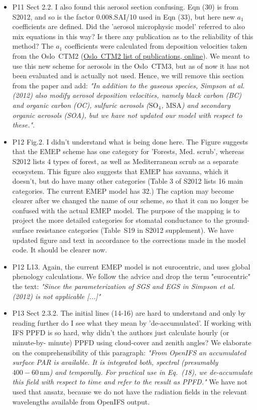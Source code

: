 \begin{itemize}
\item {\color{blue}P11 Sect 2.2. I also found this aerosol section confusing. Eqn (30) is from S2012,
and so is the factor 0.008.SAI/10 used in Eqn (33), but here new $a_1$ coefficients
are defined. Did the ’aerosol microphysic model’ referred to also mix equations
in this way? Is there any publication as to the reliability of this method?}
  The $a_1$ coefficients were calculated from deposition velocities taken from the Oslo~CTM2 (\href{http://folk.uio.no/mariantl/osloctm3/history.html}{Oslo~CTM2 list of publications, online}). We meant to use this new scheme for aerosols in the Oslo~CTM3, but as of now it has not been evaluated and is actually not used. Hence, we will remove this section from the paper and add: \emph{"In addition to the gaseous species, Simpson at al. (2012) also modify aerosol deposition velocities, namely black carbon (BC) and organic carbon (OC), sulfuric aerosols ($\mathrm{SO_4}$, $\mathrm{MSA}$) and secondary organic aerosols (SOA), but we have not updated our model with respect to these."}.
  
\item {\color{blue}P12 Fig.2. I didn’t understand what is being done here. The Figure suggests that
the EMEP scheme has one category for ’Forests, Med. scrub’, whereas S2012
lists 4 types of forest, as well as Mediterranean scrub as a separate ecosystem.
This figure also suggests that EMEP has savanna, which it doesn’t, but do have
many other categories (Table 3 of S2012 lists 16 main categories. The current
EMEP model has 32.)}
  The caption may become clearer after we changed the name of our scheme, so that it can no longer be confused with the actual EMEP model. The purpose of the mapping is to project the more detailed categories for stomatal conductance to the ground-surface resistance categories (Table~S19 in S2012 supplement). We have updated figure and text in accordance to the corrections made in the model code. It should be clearer now.
  
\item {\color{blue}P12 L13. Again, the current EMEP model is not eurocentric, and uses global
  phenology calculations.}
  We follow the advice and drop the term "eurocentric" the text: \emph{"Since the parameterization of SGS and EGS in Simpson et al. (2012) is not applicable [...]"}
  
\item {\color{blue}P13 Sect 2.3.2. The initial lines (14-16) are hard to understand and only by
reading further do I see what they mean by ’de-accumulated’. If working with
IFS PPFD is so hard, why didn’t the authors just calculate hourly (or minute-by-
minute) PPFD using cloud-cover and zenith angles?}
  We elaborate on the comprehensibility of this paragraph: \emph{"From OpenIFS an accumulated surface PAR is available. It is integrated both, spectral (presumably $400-60\,\mathrm{nm}$) and temporally. For practical use in Eq.~(18), we de-accumulate this field with respect to time and refer to the result as PPFD."}
We have not used that ansatz, because we do not have the radiation fields in the relevant wavelengths available from OpenIFS output.
\end{itemize}

%
